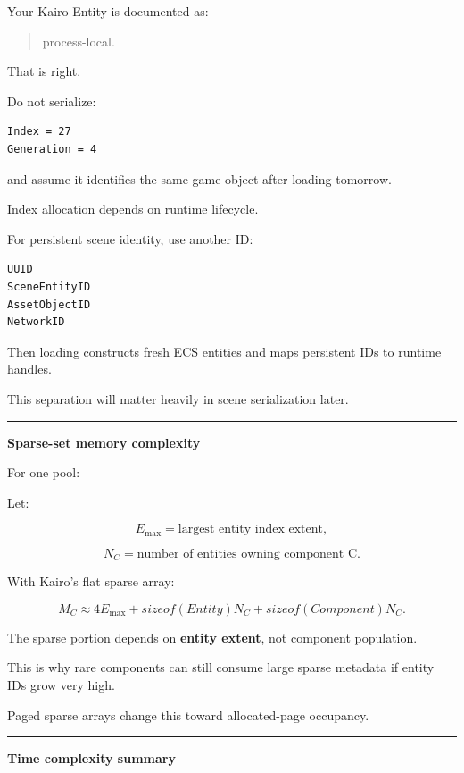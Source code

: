 Your Kairo Entity is documented as:

\begin{quote}
process-local.
\end{quote}

That is right.

Do not serialize:

\begin{verbatim}
Index = 27
Generation = 4
\end{verbatim}

and assume it identifies the same game object after loading tomorrow.

Index allocation depends on runtime lifecycle.

For persistent scene identity, use another ID:

\begin{verbatim}
UUID
SceneEntityID
AssetObjectID
NetworkID
\end{verbatim}

Then loading constructs fresh ECS entities and maps persistent IDs to runtime handles.

This separation will matter heavily in scene serialization later.

\begin{center}\rule{0.5\linewidth}{0.5pt}\end{center}

\textbf{Sparse-set memory complexity}

For one pool:

Let:

\[
E_{\max}
=
\text{largest entity index extent},
\]

\[
N_C
=
\text{number of entities owning component C}.
\]

With Kairo's flat sparse array:

\[
M_C
\approx
4E_{\max}
+
sizeof(Entity)N_C
+
sizeof(Component)N_C.
\]

The sparse portion depends on \textbf{entity extent}, not component population.

This is why rare components can still consume large sparse metadata if entity IDs grow very high.

Paged sparse arrays change this toward allocated-page occupancy.

\begin{center}\rule{0.5\linewidth}{0.5pt}\end{center}

\textbf{Time complexity summary}

